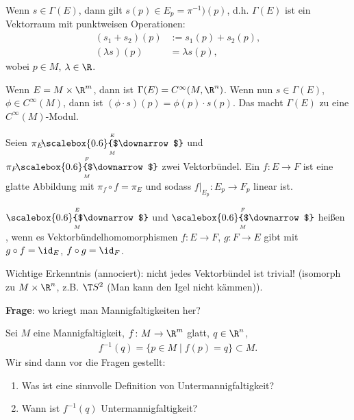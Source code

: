 Wenn $s\in\Gamma(E)$, dann gilt $s(p)\in E_p = \pi^{-1})(p)$, d.h. $\Gamma(E)$ ist ein Vektorraum mit punktweisen Operationen: \begin{align*}
	(s_1+s_2)(p) &:= s_1(p) + s_2(p),\\
	(\lambda s)(p) &= \lambda s(p),
\end{align*}
wobei $p\in M$, $\lambda\in \R$.

\begin{remark}
	Wenn $E=M\times\R^m$, dann ist $\Gamma(E) = C^\infty(M,\R^n)$. Wenn nun $s\in\Gamma(E)$, $\phi\in C^\infty(M)$, dann ist $(\phi\cdot s)(p) = \phi(p)\cdot s(p)$. Das macht $\Gamma(E)$ zu eine $C^\infty(M)$-Modul.
\end{remark}

\begin{definition}
	Seien $\pi_E\mskip-4mu\underset{\scriptscriptstyle M}{\overset{\scriptscriptstyle E}{\scalebox{0.6}{$\downarrow$}}}$ und $\pi_F\mskip-4mu\underset{\scriptscriptstyle M}{\overset{\scriptscriptstyle F}{\scalebox{0.6}{$\downarrow$}}}$ zwei Vektorbündel. Ein  $f\colon E\to F$ ist eine glatte Abbildung mit $\pi_f\circ f = \pi_E$ und sodass $f\big|_{E_p}\!\colon E_p \to F_p$ linear ist.
	\begin{center}
	\end{center}
\end{definition}

\begin{definition}
	$\underset{\scriptscriptstyle M}{\overset{\scriptscriptstyle E}{\scalebox{0.6}{$\downarrow$}}}$ und $\underset{\scriptscriptstyle M}{\overset{\scriptscriptstyle F}{\scalebox{0.6}{$\downarrow$}}}$ heißen , wenn es Vektorbündelhomomorphismen $f\colon E\to F$, $g\colon F\to E$ gibt mit $g\circ f=\id_E$, $f\circ g = \id_F$.
\end{definition}

Wichtige Erkenntnis (annociert): nicht jedes Vektorbündel ist trivial! (isomorph zu $M\times \R^n$, z.B. $\T S^2$ (Man kann den Igel nicht kämmen)).

\textbf{Frage}: wo kriegt man Mannigfaltigkeiten her?
\begin{example}
	Sei $M$ eine Mannigfaltigkeit, $f\colon M\to\R^m$ glatt, $q\in\R^n$, \begin{align*}
		f^{-1}(q) = \{p\in M\mid f(p) = q\}\subset M.
	\end{align*}
	Wir sind dann vor die Fragen gestellt: \begin{enumerate}[label={(\arabic*)}]
		\item Was ist eine sinnvolle Definition von Untermannigfaltigkeit?
		\item Wann ist $f^{-1}(q)$ Untermannigfaltigkeit?
	\end{enumerate}
\end{example}

